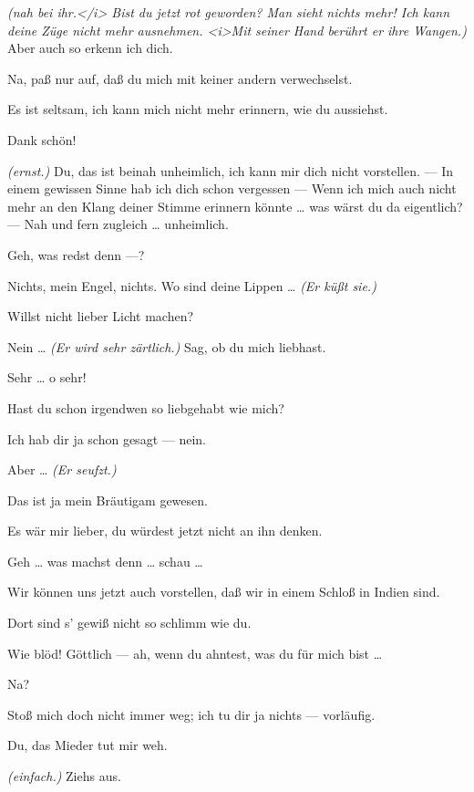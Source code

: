 \documentclass[
	final,
	a4paper,
	ngerman,
	mpinclude = true, %
	twoside = true,
	open = right,
	cleardoublepage = plain,
	DIV = 13,
	BCOR = 1cm,
	titlepage = firstiscover,
	]{scrbook}
\newcommand{\direction}[1]{\textit{(#1)}}
\newcommand{\thecharacter}[1]{\textup{\textsc{#1}}}
\newcommand{\thesuesse}{\thecharacter{Süßes Mädel}}
\newcommand{\thedichter}{\thecharacter{Dichter}}
\newcommand{\character}[1]{\item[#1:]}
\newcommand{\suesse}{\character{\thesuesse}}
\newcommand{\dichter}{\character{\thedichter}}
\begin{document}
\begin{play}
	\dichter
	\direction{nah bei ihr.</i> Bist du jetzt rot geworden? Man sieht nichts mehr! Ich kann deine Züge nicht mehr ausnehmen. <i>Mit seiner Hand berührt er ihre Wangen.} Aber auch so erkenn ich dich.

	\suesse
	Na, paß nur auf, daß du mich mit keiner andern verwechselst.

	\dichter
	Es ist seltsam, ich kann mich nicht mehr erinnern, wie du aussiehst.

	\suesse
	Dank schön!

	\dichter
	\direction{ernst.} Du, das ist beinah unheimlich, ich kann mir dich nicht vorstellen. --- In einem gewissen Sinne hab ich dich schon vergessen --- Wenn ich mich auch nicht mehr an den Klang deiner Stimme erinnern könnte \ldots{} was wärst du da eigentlich? --- Nah und fern zugleich \ldots{} unheimlich.

	\suesse
	Geh, was redst denn ---?

	\dichter
	Nichts, mein Engel, nichts. Wo sind deine Lippen \ldots{} \direction{Er küßt sie.}

	\suesse
	Willst nicht lieber Licht machen?

	\dichter
	Nein \ldots{} \direction{Er wird sehr zärtlich.} Sag, ob du mich liebhast.

	\suesse
	Sehr \ldots{} o sehr!

	\dichter
	Hast du schon irgendwen so liebgehabt wie mich?

	\suesse
	Ich hab dir ja schon gesagt --- nein.

	\dichter
	Aber \ldots{} \direction{Er seufzt.}

	\suesse
	Das ist ja mein Bräutigam gewesen.

	\dichter
	Es wär mir lieber, du würdest jetzt nicht an ihn denken.

	\suesse
	Geh \ldots{} was machst denn \ldots{} schau \ldots{}

	\dichter
	Wir können uns jetzt auch vorstellen, daß wir in einem Schloß in Indien sind.

	\suesse
	Dort sind s' gewiß nicht so schlimm wie du.

	\dichter
	Wie blöd! Göttlich --- ah, wenn du ahntest, was du für mich bist \ldots{}

	\suesse
	Na?

	\dichter
	Stoß mich doch nicht immer weg; ich tu dir ja nichts --- vorläufig.

	\suesse
	Du, das Mieder tut mir weh.

	\dichter
	\direction{einfach.} Ziehs aus.


\end{play}
\end{document}
